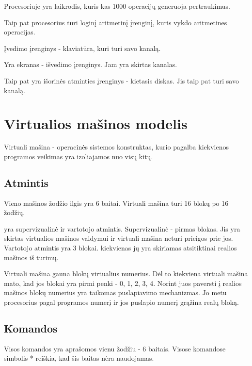 \documentclass{VUMIFInfKursinis}
\begin{document}
Procesoriuje yra laikrodis, kuris kas 1000 operacijų generuoja pertraukimus.

Taip pat procesorius turi loginį aritmetinį įrenginį, kuris vykdo aritmetines operacijas.

Įvedimo įrenginys - klaviatūra, kuri turi savo kanalą.

Yra ekranas - išvedimo įrenginys. Jam yra skirtas kanalas.

Taip pat yra išorinės atminties įrenginys - kietasis diskas. Jis taip pat turi savo kanalą.

\section{Virtualios mašinos modelis}

Virtuali mašina - operacinės sistemos konstruktas, kurio pagalba kiekvienos programos veikimas yra izoliajamos nuo visų kitų.

\subsection{Atmintis}

Vieno mašinos žodžio ilgis yra 6 baitai. Virtuali mašina turi 16 blokų po 16 žodžių.

yra supervizualinė ir vartotojo atmintis. Supervizualinė - pirmas blokas. Jis yra skirtas virtualios mašinos valdymui ir virtuali mašina neturi prieigos prie jos. Vartotojo atmintis yra 3 blokai. kiekvienas jų yra skiriamas atsitiktinai realios mašinos iš turimų.

Virtuali mašina gauna blokų virtualius numerius. Dėl to kiekviena virtuali mašina mato, kad jos blokai yra pirmi penki - 0, 1, 2, 3, 4. Norint juos paversti į realios mašinos blokų numerius yra taikomas puslapiavimo mechanizmas. Jo metu procesorius pagal programos numerį ir jos puslapio numerį grąžina realų bloką.

\subsection{Komandos}

Visos komandos yra aprašomos vienu žodžiu - 6 baitais. Visose komandose simbolis * reiškia, kad šis baitas nėra naudojamas.
\end{document}

